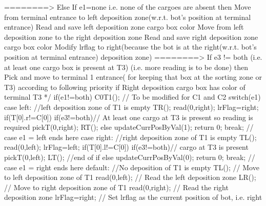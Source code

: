 {			   ========> Else If e1=none i.e. none of the cargoes are absent
			                then Move from terminal entrance to left deposition zone(w.r.t. bot's position at terminal entrance) 												 
								 Read and save left deposition zone cargo box color
								 Move from left deposition zone to the right deposition zone
								 Read and save right deposition zone cargo box color	
								 Modify lrflag to right(because the bot is at the right(w.r.t. bot's position at terminal entrance) deposition zone)						  
								 ========> If e3 != both (i.e. at least one cargo box is present at T3)
								                         (i.e. more reading is to be done)
											  then Pick and move to terminal 1 entrance( for keeping that box at the sorting zone or T3) according to following priority
											       if Right deposition cargo box has color of terminal T3			 
	*/
    if(e1!=both)
    {
        C0T1(); // To be modified for C1 and C2
        switch(e1)
        {
            case left:
                //left deposition zone of T1 is empty
                TR();
                read(0,right);
				lrFlag=right;
                if(T[0].r!=C[0])
                {
                    if(e3!=both)// At least one cargo at T3 is present so reading is required
                    {
                        pickT(0,right);
                        RT();
                    }
                    else
                    {
                        updateCurrPosByVal(1);
                        return 0;
                    }
                }
                break;
				// case e1 = left ends here
            case right:
                //right deposition zone of T1 is empty
                TL();
                read(0,left);
				lrFlag=left;
                if(T[0].l!=C[0])
                {
                    if(e3!=both)// cargo at T3 is present
                    {
                        pickT(0,left);
                        LT();
                    }//end of if
                    else
                    {
                        updateCurrPosByVal(0);
                        return 0;
                    }
                }
                break;
				// case e1 = right ends here
            default:
                //No deposition of T1 is empty
                TL();           // Move to left deposition zone of T1
                read(0,left);   // Read the left deposition zone
                LR();           // Move to right deposition zone of T1
                read(0,right);  // Read the right deposition zone
				lrFlag=right;   // Set lrflag as the current position of bot, i.e. right
}}}
